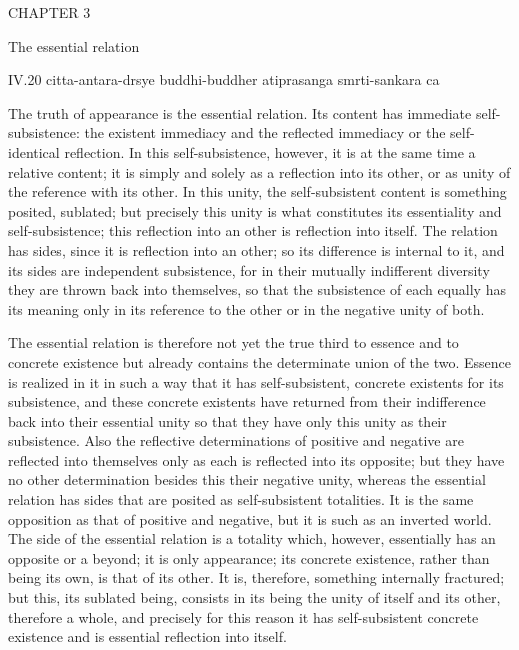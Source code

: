 CHAPTER 3

The essential relation

IV.20
citta-antara-drsye buddhi-buddher atiprasanga smrti-sankara ca

The truth of appearance is the essential relation.
Its content has immediate self-subsistence:
the existent immediacy and the reflected immediacy
or the self-identical reflection.
In this self-subsistence, however,
it is at the same time a relative content;
it is simply and solely as a reflection into its other,
or as unity of the reference with its other.
In this unity, the self-subsistent content is something posited, sublated;
but precisely this unity is what constitutes
its essentiality and self-subsistence;
this reflection into an other is reflection into itself.
The relation has sides, since it is reflection into an other;
so its difference is internal to it,
and its sides are independent subsistence,
for in their mutually indifferent diversity
they are thrown back into themselves,
so that the subsistence of each equally has its meaning
only in its reference to the other or in the negative unity of both.

The essential relation is therefore not yet the true third
to essence and to concrete existence
but already contains the determinate union of the two.
Essence is realized in it in such a way that it has self-subsistent,
concrete existents for its subsistence,
and these concrete existents have returned
from their indifference back into their essential unity
so that they have only this unity as their subsistence.
Also the reflective determinations of positive and negative are
reflected into themselves only as each is reflected into its opposite;
but they have no other determination besides this their negative unity,
whereas the essential relation has sides
that are posited as self-subsistent totalities.
It is the same opposition as that of positive and negative,
but it is such as an inverted world.
The side of the essential relation is a totality
which, however, essentially has an opposite or a beyond;
it is only appearance; its concrete existence, rather than being its own,
is that of its other.
It is, therefore, something internally fractured;
but this, its sublated being, consists in
its being the unity of itself and its other,
therefore a whole, and precisely for this reason
it has self-subsistent concrete existence
and is essential reflection into itself.

